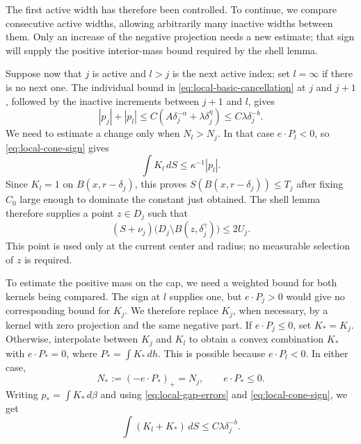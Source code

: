 The first active width has therefore been controlled. To continue,
we compare consecutive active widths, allowing arbitrarily many
inactive widths between them. Only an increase of the negative
projection needs a new estimate; that sign will supply the positive
interior-mass bound required by the shell lemma.

Suppose now that $j$ is active and $l>j$ is the next active index;
set $l=\infty$ if there is no next one. The individual bound in
\eqref{eq:local-basic-cancellation} at $j$ and $j+1$, followed by
the inactive increments between $j+1$ and $l$, gives
\begin{equation}\label{eq:local-gap-errors}
|p_j|+|p_l|
 \le C\left(A\delta_j^{-\alpha}
                  +\lambda\delta_j^\eta\right)
 \le C\lambda\delta_j^{-b}.
\end{equation}
We need to estimate a change only when $N_l>N_j$. In that case
$e\cdot P_l<0$, so \eqref{eq:local-cone-sign} gives
\[
\int K_l\,dS\le\kappa^{-1}|p_l|.
\]
Since $K_l=1$ on $B(x,r-\delta_j)$, this proves
$S(B(x,r-\delta_j))\le T_j$ after fixing $C_0$ large enough to
dominate the constant just obtained. The shell lemma therefore
supplies a point $z\in D_j$ such that
\begin{equation}\label{eq:local-chosen-cap}
(S+\nu_j)\bigl(D_j\setminus B(z,\delta_j^\gamma)\bigr)
 \le2U_j.
\end{equation}
This point is used only at the current center and radius; no
measurable selection of $z$ is required.

To estimate the positive mass on the cap, we need a weighted bound
for both kernels being compared. The sign at $l$ supplies one, but
$e\cdot P_j>0$ would give no corresponding bound for $K_j$.
We therefore replace $K_j$, when necessary, by a kernel with zero
projection and the same negative part.
If $e\cdot P_j\le0$, set $K_*=K_j$. Otherwise, interpolate between
$K_j$ and $K_l$ to obtain a convex combination $K_*$ with
$e\cdot P_*=0$, where $P_* =\int K_*\,dh$. This is possible because
$e\cdot P_l<0$. In either case,
\[
N_*:=(-e\cdot P_*)_+=N_j,
\qquad e\cdot P_*\le0.
\]
Writing $p_* =\int K_*\,d\beta$ and using
\eqref{eq:local-gap-errors} and \eqref{eq:local-cone-sign}, we get
\begin{equation}\label{eq:local-weighted-good}
\int(K_l+K_*)\,dS\le C\lambda\delta_j^{-b}.
\end{equation}

